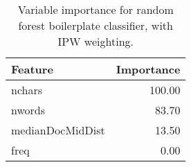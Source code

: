 \begin{table}[ht]
\centering
\begin{tabular}{lr}
  \hline
Feature & Importance \\ 
  \hline
nchars & 100.00 \\ 
  nwords & 83.70 \\ 
  medianDocMidDist & 13.50 \\ 
  freq & 0.00 \\ 
   \hline
\end{tabular}
\caption{Variable importance for random forest boilerplate classifier, with IPW weighting.} 
\label{randomForestVarimp}
\end{table}

